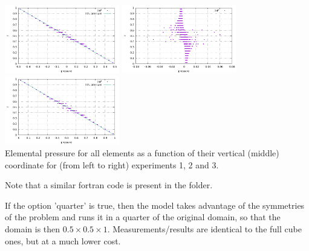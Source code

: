 \begin{center}
\includegraphics[width=5cm]{python_codes/fieldstone_10/results/model1/pressure.pdf}
\includegraphics[width=5cm]{python_codes/fieldstone_10/results/model2/pressure.pdf}
\includegraphics[width=5cm]{python_codes/fieldstone_10/results/model3/pressure.pdf}\\
{\captionfont Elemental pressure for all elements as a function of their vertical (middle) coordinate for
(from left to right) experiments 1, 2 and 3. }
\end{center}

Note that a similar fortran code is present in the folder. 


If the option 'quarter' is true, then the model takes advantage of the symmetries 
of the problem and runs it in a quarter of the original domain, so that 
the domain is then $0.5\times 0.5 \times 1$. Measurements/results are identical 
to the full cube ones, but at a much lower cost.


